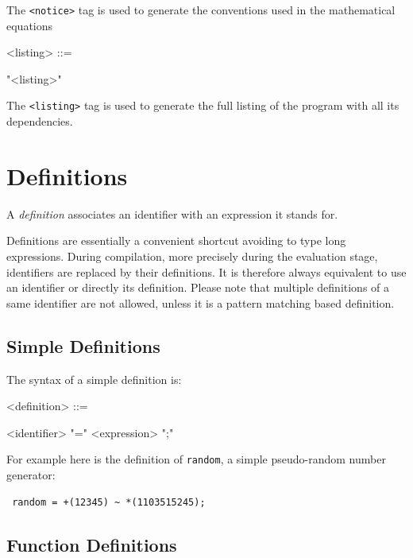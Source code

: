 \documentclass[a4paper]{book}
\begin{document}
The \lstinline'<notice>' tag is used to generate the conventions used in the mathematical equations

\begin{grammar}
  <listing> ::= 
  \begin{syntdiag}
    "<listing>"
  \end{syntdiag}
\end{grammar}

The \lstinline'<listing>' tag is used to generate the full listing of the \faust program with all its dependencies.



\section{Definitions}

A \textit{definition} associates an identifier with an expression it stands for. 

Definitions are essentially a convenient shortcut avoiding to type long expressions. During compilation, more precisely during the evaluation stage, identifiers are replaced by their definitions. It is therefore always equivalent to use an identifier or directly its definition. Please note that multiple definitions of a same identifier are not allowed, unless it is a pattern matching based definition.

\subsection{Simple Definitions}

The syntax of a simple definition is:

\begin{grammar}
  <definition> ::= 
  \begin{syntdiag}
    <identifier> "=" <expression> ";"
  \end{syntdiag}
\end{grammar}

For example here is the definition of \lstinline'random', a simple pseudo-random number generator:

\begin{lstlisting}
 random = +(12345) ~ *(1103515245);
\end{lstlisting}


\subsection{Function Definitions}
\end{document}
